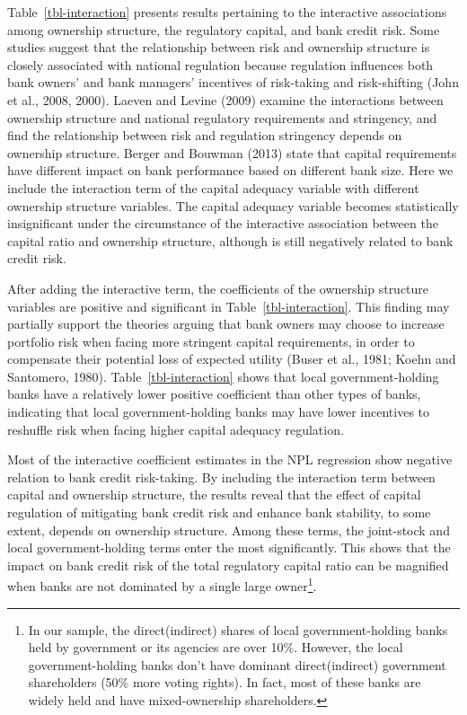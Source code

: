 \documentclass[
  12pt,
  a4paper,
]{scrreprt}
\begin{document}
{{{{\begin{longtable}[]
\end{longtable}

Table~\ref{tbl-interaction} presents results pertaining to the
interactive associations among ownership structure, the regulatory
capital, and bank credit risk. Some studies suggest that the
relationship between risk and ownership structure is closely associated
with national regulation because regulation influences both bank owners'
and bank managers' incentives of risk-taking and risk-shifting (John et
al., 2008, 2000). Laeven and Levine (2009) examine the interactions
between ownership structure and national regulatory requirements and
stringency, and find the relationship between risk and regulation
stringency depends on ownership structure. Berger and Bouwman (2013)
state that capital requirements have different impact on bank
performance based on different bank size. Here we include the
interaction term of the capital adequacy variable with different
ownership structure variables. The capital adequacy variable becomes
statistically insignificant under the circumstance of the interactive
association between the capital ratio and ownership structure, although
is still negatively related to bank credit risk.

After adding the interactive term, the coefficients of the ownership
structure variables are positive and significant in
Table~\ref{tbl-interaction}. This finding may partially support the
theories arguing that bank owners may choose to increase portfolio risk
when facing more stringent capital requirements, in order to compensate
their potential loss of expected utility (Buser et al., 1981; Koehn and
Santomero, 1980). Table~\ref{tbl-interaction} shows that local
government-holding banks have a relatively lower positive coefficient
than other types of banks, indicating that local government-holding
banks may have lower incentives to reshuffle risk when facing higher
capital adequacy regulation.

Most of the interactive coefficient estimates in the NPL regression show
negative relation to bank credit risk-taking. By including the
interaction term between capital and ownership structure, the results
reveal that the effect of capital regulation of mitigating bank credit
risk and enhance bank stability, to some extent, depends on ownership
structure. Among these terms, the joint-stock and local
government-holding terms enter the most significantly. This shows that
the impact on bank credit risk of the total regulatory capital ratio can
be magnified when banks are not dominated by a single large
owner\footnote{In our sample, the direct(indirect) shares of local
  government-holding banks held by government or its agencies are over
  10\%. However, the local government-holding banks don't have dominant
  direct(indirect) government shareholders (50\% more voting rights). In
  fact, most of these banks are widely held and have mixed-ownership
  shareholders.}.

}}}}
\end{document}
